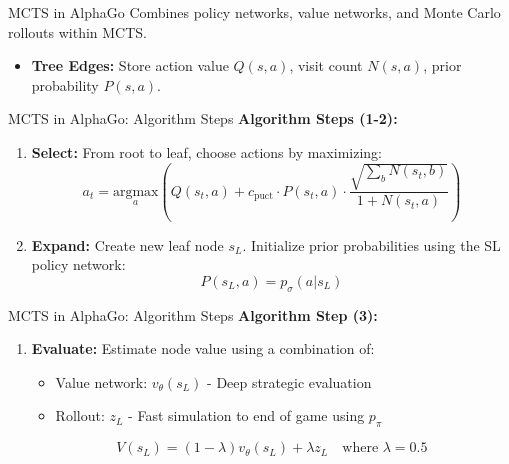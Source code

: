 \documentclass{beamer}
\begin{document}
\begin{frame}{MCTS in AlphaGo}
    Combines policy networks, value networks, and Monte Carlo rollouts within MCTS.
    \vspace{2ex}
    \begin{itemize}
        \item \textbf{Tree Edges:} Store action value $Q(s, a)$, visit count $N(s, a)$, prior probability $P(s, a)$.
    \end{itemize}
\end{frame}

\begin{frame}{MCTS in AlphaGo: Algorithm Steps}
    \textbf{Algorithm Steps (1-2):}
    \vspace{2ex}
    \begin{enumerate}
        \setlength{\itemsep}{3ex}
        \item \textbf{Select:} From root to leaf, choose actions by maximizing:
        $$ a_t = \underset{a}{\text{argmax}} \left( Q(s_t, a) + c_{\text{puct}} \cdot P(s_t, a) \cdot \frac{\sqrt{\sum_b N(s_t, b)}}{1 + N(s_t, a)} \right) $$
        \item \textbf{Expand:} Create new leaf node $s_L$. Initialize prior probabilities using the SL policy network:
        $$ P(s_L, a) = p_{\sigma}(a|s_L) $$
    \end{enumerate}
\end{frame}

\begin{frame}{MCTS in AlphaGo: Algorithm Steps}
    \textbf{Algorithm Step (3):}
    \vspace{2ex}
    \begin{enumerate}
        \setlength{\itemsep}{3ex}
        \setcounter{enumi}{2}
        \item \textbf{Evaluate:} Estimate node value using a combination of:
        \vspace{2ex}
        \begin{itemize}
            \item Value network: $v_{\theta}(s_L)$ - Deep strategic evaluation
            \item Rollout: $z_L$ - Fast simulation to end of game using $p_{\pi}$
        \end{itemize}
        \vspace{3ex}
        $$ V(s_L) = (1-\lambda)v_{\theta}(s_L) + \lambda z_L \quad \text{where } \lambda=0.5 $$
    \end{enumerate}
\end{frame}
\end{document}
